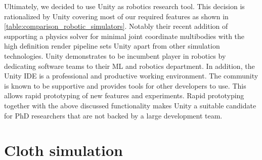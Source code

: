 \documentclass[\home/main.tex]{subfiles}
\begin{document}
Ultimately, we decided to use Unity as robotics research tool. This decision is rationalized by Unity covering most of our required features as shown in \cref{table:comparison_robotic_simulators}. Notably their recent addition of supporting a physics solver for minimal joint coordinate multibodies with the high definition render pipeline sets Unity apart from other simulation technologies. Unity demonstrates to be incumbent player in robotics by dedicating software teams to their ML and robotics department. In addition, the Unity IDE is a professional and productive working environment. The community is known to be supportive and provides tools for other developers to use. This allows rapid prototyping of new features and experiments. Rapid prototyping together with the above discussed functionality makes Unity a suitable candidate for PhD researchers that are not backed by a large development team. 



\section{Cloth simulation}

\end{document}
